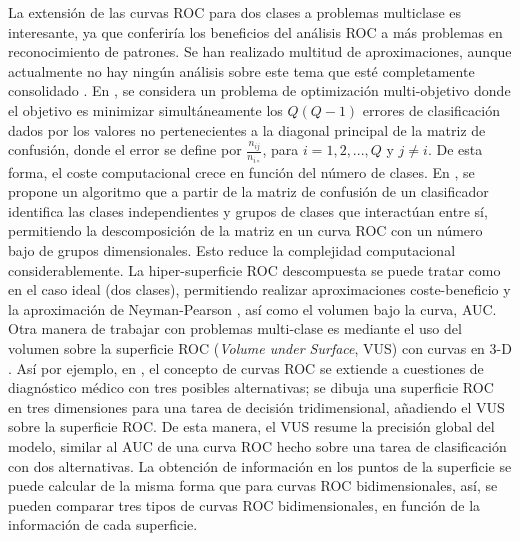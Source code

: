 La extensión de las curvas ROC para dos clases a problemas multiclase
es interesante, ya que conferiría los beneficios del análisis ROC a más
problemas en reconocimiento de patrones. Se han realizado multitud de aproximaciones,
aunque actualmente no hay ningún análisis sobre
este tema que esté completamente consolidado \cite{Lachiche2003}. En \cite{Everson2006}, se
considera un problema de optimización	multi-objetivo donde el objetivo es minimizar
simultáneamente los $Q(Q-1)$ errores de	clasificación dados por los valores no
pertenecientes a la diagonal principal de la matriz de	confusión, donde el error se
define por $\displaystyle \frac{n_{ij}}{n_{i\circ}}$, para $i=1,2,...,Q$ y $j\neq i$. De
esta forma, el coste computacional crece en función del número de	clases. En
\cite{Langrebe2008}, se propone un algoritmo que a partir de la matriz de confusión
de un clasificador identifica las clases independientes y grupos de clases que
interactúan entre sí, permitiendo la descomposición de la matriz en un curva ROC con un
número bajo de grupos dimensionales. Esto reduce la complejidad computacional
considerablemente. La hiper-superficie ROC descompuesta se puede tratar como en el
caso ideal (dos clases), permitiendo realizar aproximaciones coste-beneficio y la
aproximación de Neyman-Pearson \cite{Edwards2004}, así como el volumen bajo la curva,
AUC. Otra manera de trabajar con problemas multi-clase es mediante el uso del
volumen sobre la superficie ROC (\textit{Volume under Surface}, VUS) \cite{Dreiseitl2007}
con curvas en 3-D \cite{Sahiner2008,He2008}. Así por ejemplo, en \cite{Mossman1999}, el
concepto de curvas ROC se extiende a cuestiones de diagnóstico médico con tres
posibles alternativas; se dibuja una superficie ROC en tres dimensiones para una
tarea de decisión tridimensional, añadiendo el VUS sobre la superficie ROC. De esta
manera, el VUS resume la precisión global del modelo,
similar al AUC de una curva ROC hecho sobre una tarea de
clasificación con dos	alternativas. La obtención de información en los puntos de la
superficie se puede	calcular de la misma forma que para curvas ROC bidimensionales, así,
se pueden comparar tres tipos de curvas ROC bidimensionales, en función de la información
de cada superficie.

